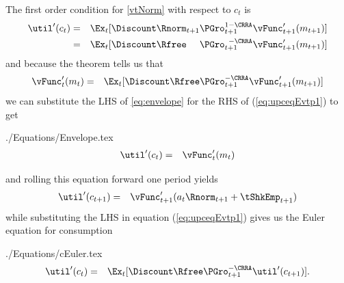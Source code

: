 \documentclass[titlepage]{\econtex}
\begin{document}
The first order condition for \eqref{vtNorm} with respect to ${c}_{t}$ is
\begin{eqnarray}
        \util^{\prime}({c}_{t}) & = & \Ex_{t}[\Discount \Rnorm_{t+1}\PGro_{t+1}^{1-\CRRA}\null{\vFunc}^{\prime}_{t+1}({m}_{t+1})]  \nonumber 
\\  & = &  \Ex_{t}[\Discount\Rfree\phantom{_{t+1}}\PGro_{t+1}^{\phantom{1}-\CRRA}\null{\vFunc}^{\prime}_{t+1}({m}_{t+1})] \label{eq:upceqEvtp1}
\end{eqnarray}
and because the  theorem tells us that
\begin{eqnarray}
        \null{\vFunc}^{\prime}_{t}({m}_{t}) & = &  \Ex_{t} [\Discount\Rfree\PGro_{t+1}^{-\CRRA}\null{\vFunc}^{\prime}_{t+1}({m}_{t+1})] \label{eq:envelope}
\end{eqnarray}
we can substitute the LHS of \eqref{eq:envelope} for the RHS of
 (\ref{eq:upceqEvtp1}) to get
\begin{verbatimwrite}{./Equations/Envelope.tex}
\begin{eqnarray}
        \util^{\prime}({c}_{t}) & = & \null{\vFunc}^{\prime}_{t}({m}_{t})\label{eq:Envelope}
\end{eqnarray}
\end{verbatimwrite}

and rolling this equation forward one period yields
\begin{eqnarray}
        \util^{\prime}({c}_{t+1}) & = & \null{\vFunc}^{\prime}_{t+1}({a}_{t}\Rnorm_{t+1}+\tShkEmp_{t+1}) \label{eq:upctp1EqVpxtp1}
\end{eqnarray}
while substituting the LHS in equation (\ref{eq:upceqEvtp1})
gives us the Euler equation for consumption
\begin{verbatimwrite}{./Equations/cEuler.tex}
\begin{eqnarray}
        \util^{\prime}({c}_{t}) & = & \Ex_{t}[\Discount\Rfree \PGro_{t+1}^{-\CRRA}\util^{\prime}({c}_{t+1})]. \label{eq:cEuler}
\end{eqnarray}
\end{verbatimwrite}

\end{document}
